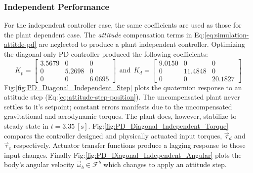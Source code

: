 \subsubsection{Independent Performance}
\label{subsubsec:simulation.atttiude.pd.independent}
For the independent controller case, the same coefficients are used as those for the plant dependent case. The \emph{attitude} compensation terms in Eq:\ref{eq:simulation-attitde-pd} are neglected to produce a plant independent controller. Optimizing the diagonal only PD controller produced the following coefficients:
\begin{equation}\label{eq:optimized-pd-independent}
K_p = \begin{bmatrix}
3.5679 & 0 & 0\\
0 & 5.2698 & 0\\
0 & 0 & 6.0695
\end{bmatrix}
~~\text{and}~~K_d = \begin{bmatrix}
9.0150 & 0 & 0\\
0 & 11.4848 & 0\\
0 & 0 & 20.1827
\end{bmatrix}
\end{equation}
Fig:\ref{fig:PD_Diagonal_Independent_Step} plots the quaternion response to an attitude step (Eq:\ref{eq:attitude-step-position}). The uncompensated plant never settles to it's setpoint; constant errors manifests due to the uncompensated gravitational and aerodynamic torques. The plant does, however, stabilize to steady state in $t = 3.35~[\text{s}]$. Fig:\ref{fig:PD_Diagonal_Independent_Torque} compares the controller designed and physically actuated input torques, $\vec{\tau}_d$ and $\vec{\tau}_c$ respectively. Actuator transfer functions produce a lagging response to those input changes. Finally Fig:\ref{fig:PD_Diagonal_Independent_Angular} plots the body's angular velocity $\vec{\omega}_b\in\mathcal{F}^{b}$ which changes to apply an attitude step.
\par
